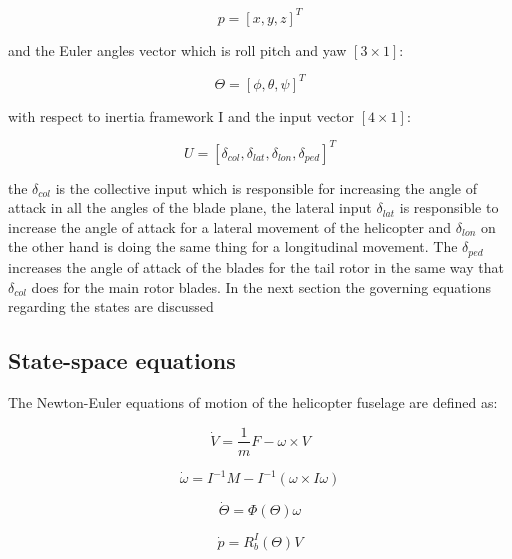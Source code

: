 \begin{equation}
	p=[x,y,z]^T
\end{equation}

and the Euler angles vector which is roll pitch and yaw $[3\times1]$:

\begin{equation}
	\Theta=[\phi,\theta,\psi]^T
\end{equation}

with respect to inertia framework {I} and the input vector $[4\times1]$:

\begin{equation}
	U=[\delta_{col},\delta_{lat},\delta_{lon},\delta_{ped}]^T
\end{equation} 

the $\delta_{col}$ is the collective input which is responsible for increasing the angle of attack in all the angles of the blade plane, the lateral input $\delta_{lat}$ is responsible to increase the angle of attack for a lateral movement of the helicopter and $\delta_{lon}$ on the other hand is doing the same thing for a longitudinal movement. The $\delta_{ped}$ increases the angle of attack of the blades for the tail rotor in the same way that $\delta_{col}$ does for the main rotor blades.
In the next section the governing equations regarding the states are discussed

\subsection{State-space equations}

The Newton-Euler equations of motion of the helicopter fuselage are defined as:

\begin{equation}\label{eq1}
	\dot{V}=\frac{1}{m} F-\omega\times V
\end{equation}

\begin{equation}\label{eq2}
	\dot{\omega}=I^{-1}M-I^{-1}(\omega \times I \omega) 
\end{equation}

\begin{equation}
	\dot{\Theta}=\Phi(\Theta)\omega 
\end{equation}

\begin{equation}
	\dot{p}=R_{b}^I(\Theta)V
\end{equation}

